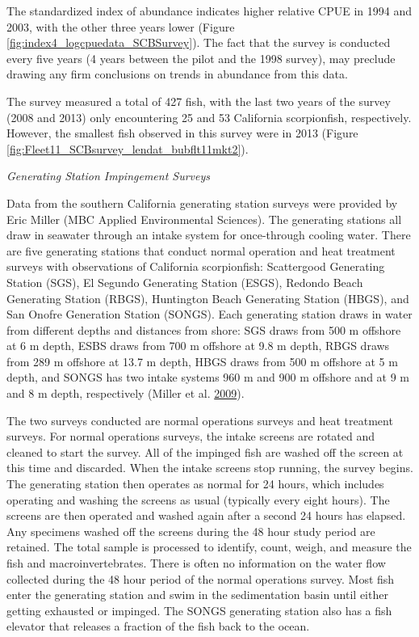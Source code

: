 \documentclass[12pt,]{article}
\begin{document}
The standardized index of abundance indicates higher relative CPUE in
1994 and 2003, with the other three years lower (Figure
\ref{fig:index4_logcpuedata_SCBSurvey}). The fact that the survey is
conducted every five years (4 years between the pilot and the 1998
survey), may preclude drawing any firm conclusions on trends in
abundance from this data.

The survey measured a total of 427 fish, with the last two years of the
survey (2008 and 2013) only encountering 25 and 53 California
scorpionfish, respectively.\\
However, the smallest fish observed in this survey were in 2013 (Figure
\ref{fig:Fleet11_SCBsurvey_lendat_bubflt11mkt2}).

\emph{Generating Station Impingement Surveys}

Data from the southern California generating station surveys were
provided by Eric Miller (MBC Applied Environmental Sciences). The
generating stations all draw in seawater through an intake system for
once-through cooling water. There are five generating stations that
conduct normal operation and heat treatment surveys with observations of
California scorpionfish: Scattergood Generating Station (SGS), El
Segundo Generating Station (ESGS), Redondo Beach Generating Station
(RBGS), Huntington Beach Generating Station (HBGS), and San Onofre
Generation Station (SONGS). Each generating station draws in water from
different depths and distances from shore: SGS draws from 500 m offshore
at 6 m depth, ESBS draws from 700 m offshore at 9.8 m depth, RBGS draws
from 289 m offshore at 13.7 m depth, HBGS draws from 500 m offshore at 5
m depth, and SONGS has two intake systems 960 m and 900 m offshore and
at 9 m and 8 m depth, respectively (Miller et al.
\protect\hyperlink{ref-Miller2009}{2009}).

The two surveys conducted are normal operations surveys and heat
treatment surveys. For normal operations surveys, the intake screens are
rotated and cleaned to start the survey. All of the impinged fish are
washed off the screen at this time and discarded. When the intake
screens stop running, the survey begins. The generating station then
operates as normal for 24 hours, which includes operating and washing
the screens as usual (typically every eight hours). The screens are then
operated and washed again after a second 24 hours has elapsed. Any
specimens washed off the screens during the 48 hour study period are
retained. The total sample is processed to identify, count, weigh, and
measure the fish and macroinvertebrates. There is often no information
on the water flow collected during the 48 hour period of the normal
operations survey. Most fish enter the generating station and swim in
the sedimentation basin until either getting exhausted or impinged. The
SONGS generating station also has a fish elevator that releases a
fraction of the fish back to the ocean.
\end{document}
